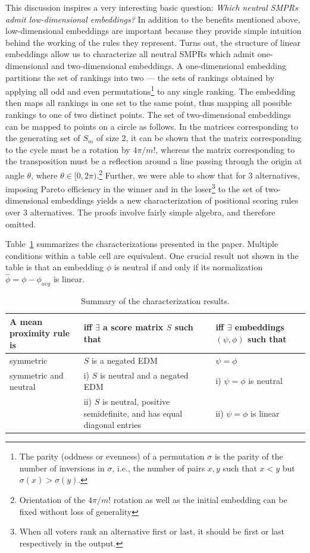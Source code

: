 \documentclass[prodmode]{acmsmall-ec14}
\begin{document}
This discussion inspires a very interesting basic question: \emph{Which neutral SMPRs admit low-dimensional embeddings?} In addition to the benefits mentioned above, low-dimensional embeddings are important because they provide simple intuition behind the working of the rules they represent. Turns out, the structure of linear embeddings allow us to characterize all neutral SMPRs which admit one-dimensional and two-dimensional embeddings. A one-dimensional embedding partitions the set of rankings into two --- the sets of rankings obtained by applying all odd and even permutations\footnote{The parity (oddness or evenness) of a permutation $\sigma$ is the parity of the number of inversions in $\sigma$, i.e., the number of pairs $x,y$ such that $x < y$ but $\sigma(x) > \sigma(y)$.} to any single ranking. The embedding then maps all rankings in one set to the same point, thus mapping all possible rankings to one of two distinct points. The set of two-dimensional embeddings can be mapped to points on a circle as follows. In the matrices corresponding to the generating set of $S_m$ of size $2$, it can be shown that the matrix corresponding to the cycle must be a rotation by $4 \pi / m!$, whereas the matrix corresponding to the transposition must be a reflection around a line passing through the origin at angle $\theta$, where $\theta \in [0,2\pi)$.\footnote{Orientation of the $4\pi/m!$ rotation as well as the initial embedding can be fixed without loss of generality} Further, we were able to show that for $3$ alternatives, imposing Pareto efficiency in the winner and in the loser\footnote{When all voters rank an alternative first or last, it should be first or last respectively in the output.} to the set of two-dimensional embeddings yields a new characterization of positional scoring rules over $3$ alternatives. The proofs involve fairly simple algebra, and therefore omitted.  

Table~\ref{tab:summary} summarizes the characterizations presented in the paper. Multiple conditions within a table cell are equivalent. One crucial result not shown in the table is that an embedding $\phi$ is neutral if and only if its normalization $\hat{\phi} = \phi-\phi_{avg}$ is linear. 

\begin{table}[ht]
\centering
\begin{tabular}{ | p{3.8cm} | p{5.8cm} | p{3cm} | }
\hline
\rule{0pt}{3ex}\textbf{A mean proximity rule is} & \textbf{iff $\boldsymbol{\exists}$ a score matrix $S$ such that} & \textbf{iff $\exists$ embeddings $(\psi,\phi)$ such that} \\[0.1cm] 
\hline 
\rule{0pt}{3ex}symmetric & $S$ is a negated EDM & $\psi = \phi$ \\[0.1cm]
\hline
\rule{0pt}{3ex}\multirow{2}{*} {symmetric and neutral} & i) $S$ is neutral and a negated EDM & i) $\psi = \phi$ is neutral\\
& ii) $S$ is neutral, positive semidefinite, and has equal diagonal entries & ii) $\psi = \phi$ is linear \\[0.1cm]
\hline
\end{tabular}
\captionsetup{width=\textwidth}
\caption{Summary of the characterization results.}
\label{tab:summary}
\end{table}
\end{document}

